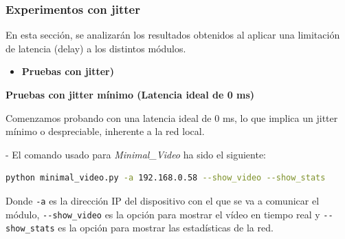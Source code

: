 \subsubsection{Experimentos con jitter}

En esta sección, se analizarán los resultados obtenidos al aplicar una limitación de latencia (delay) a los distintos módulos.

\begin{itemize}
    \item \textbf{Pruebas con jitter)}
\end{itemize}

\textbf{Pruebas con jitter mínimo (Latencia ideal de 0 ms)}
\vspace{\baselineskip}

Comenzamos probando con una latencia ideal de 0 ms, lo que implica un jitter mínimo o despreciable, inherente a la red local.

- El comando usado para \textit{Minimal\_Video} ha sido el siguiente:
\vspace{\baselineskip}

\begin{lstlisting}[language=bash]
python minimal_video.py -a 192.168.0.58 --show_video --show_stats
\end{lstlisting}
Donde \verb|-a| es la dirección IP del dispositivo con el que se va a comunicar el módulo, \verb|--show_video| es la opción para mostrar el vídeo en tiempo real y \verb|--show_stats| es la opción para mostrar las estadísticas de la red.
\vspace{\baselineskip}

